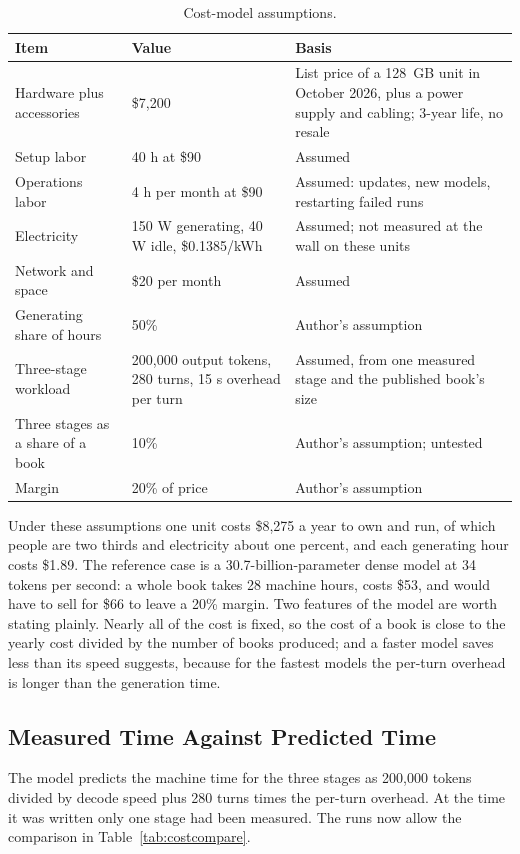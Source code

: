 \documentclass[11pt]{article}
\begin{document}
\begin{table}[htbp]
\centering
\small
\begin{tabular}{@{}p{4.3cm}p{4.3cm}p{6.6cm}@{}}
\toprule
\textbf{Item} & \textbf{Value} & \textbf{Basis} \\
\midrule
Hardware plus accessories & \$7,200 & List price of a 128~GB unit in October 2026, plus a power supply and cabling; 3-year life, no resale \\
Setup labor & 40 h at \$90 & Assumed \\
Operations labor & 4 h per month at \$90 & Assumed: updates, new models, restarting failed runs \\
Electricity & 150 W generating, 40 W idle, \$0.1385/kWh & Assumed; not measured at the wall on these units \\
Network and space & \$20 per month & Assumed \\
Generating share of hours & 50\% & Author's assumption \\
Three-stage workload & 200,000 output tokens, 280 turns, 15 s overhead per turn & Assumed, from one measured stage and the published book's size \\
Three stages as a share of a book & 10\% & Author's assumption; untested \\
Margin & 20\% of price & Author's assumption \\
\bottomrule
\end{tabular}
\caption{Cost-model assumptions.}
\label{tab:costassume}
\end{table}

Under these assumptions one unit costs \$8,275 a year to own and run, of which people are two thirds and electricity about one percent, and each generating hour costs \$1.89. The reference case is a 30.7-billion-parameter dense model at 34 tokens per second: a whole book takes 28 machine hours, costs \$53, and would have to sell for \$66 to leave a 20\% margin. Two features of the model are worth stating plainly. Nearly all of the cost is fixed, so the cost of a book is close to the yearly cost divided by the number of books produced; and a faster model saves less than its speed suggests, because for the fastest models the per-turn overhead is longer than the generation time.

\subsection{Measured Time Against Predicted Time}

The model predicts the machine time for the three stages as 200,000 tokens divided by decode speed plus 280 turns times the per-turn overhead. At the time it was written only one stage had been measured. The runs now allow the comparison in Table~\ref{tab:costcompare}.
\end{document}

